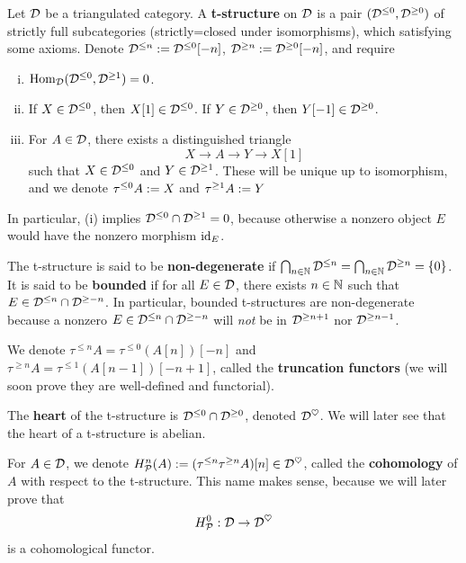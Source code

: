 \documentclass[12pt]{article}
\begin{document}
\begin{defn}
    Let $\mathcal{D}$ be a triangulated category. A \textbf{t-structure} on $\mathcal{D}$ is a pair $(\mathcal{D}^{\leq 0}, \mathcal{D}^{\geq 0})$ of strictly full subcategories (strictly=closed under isomorphisms), which satisfying some axioms. Denote $\mathcal{D}^{\leq n} := \mathcal{D}^{\leq 0}[-n]$, $\mathcal{D}^{\geq n} := \mathcal{D}^{\geq 0}[-n]$, and require
    \begin{enumerate}[(i)]
        \item $\mathrm{Hom}_{\mathcal{D}}(\mathcal{D}^{\leq 0},\mathcal{D}^{\geq 1})=0$.
        \item If $X\in \mathcal{D}^{\leq 0}$, then $X[1]\in \mathcal{D}^{\leq 0}$. If $Y\in \mathcal{D}^{\geq 0}$, then $Y[-1]\in \mathcal{D}^{\geq 0}$.
        \item For $A\in \mathcal{D}$, there exists a distinguished triangle
        \[X \to A \to Y \to X[1]\]
        such that $X\in \mathcal{D}^{\leq 0}$ and $Y\in \mathcal{D}^{\geq 1}$. These will be unique up to isomorphism, and we denote $\tau^{\leq 0} A := X$ and $\tau^{\geq 1} A := Y$
    \end{enumerate}

    In particular, (i) implies $\mathcal{D}^{\leq 0} \cap \mathcal{D}^{\geq 1} = 0$, because otherwise a nonzero object $E$ would have the nonzero morphism $\mathrm{id}_E$.
    
    The t-structure is said to be \textbf{non-degenerate} if $\bigcap_{n\in \mathbb{N}} \mathcal{D}^{\leq n} = \bigcap_{n\in \mathbb{N}} \mathcal{D}^{\geq n} = \{0\}$. It is said to be \textbf{bounded} if for all $E\in \mathcal{D}$, there exists $n\in \mathbb{N}$ such that $E\in \mathcal{D}^{\leq n} \cap \mathcal{D}^{\geq -n}$. In particular, bounded t-structures are non-degenerate because a nonzero $E\in \mathcal{D}^{\leq n} \cap \mathcal{D}^{\geq -n}$ will \textit{not} be in $\mathcal{D}^{\geq n+1}$ nor $\mathcal{D}^{\geq n-1}$.
    
    We denote $\tau^{\leq n} A = \tau^{\leq 0} (A[n])[-n]$ and $\tau^{\geq n} A = \tau^{\leq 1}(A[n-1])[-n+1]$, called the \textbf{truncation functors} (we will soon prove they are well-defined and functorial).

    The \textbf{heart} of the t-structure is $\mathcal{D}^{\leq 0} \cap \mathcal{D}^{\geq 0}$, denoted $\mathcal{D}^\heartsuit$. We will later see that the heart of a t-structure is abelian.

    For $A\in \mathcal{D}$, we denote $H^n_{\mathcal{P}}(A) := (\tau^{\leq n} \tau^{\geq n} A)[n] \in \mathcal{D}^\heartsuit$, called the \textbf{cohomology} of $A$ with respect to the t-structure. This name makes sense, because we will later prove that
    \[H^0_{\mathcal{P}}: \mathcal{D} \to \mathcal{D}^\heartsuit\]
    is a cohomological functor.
\end{defn}
\end{document}
